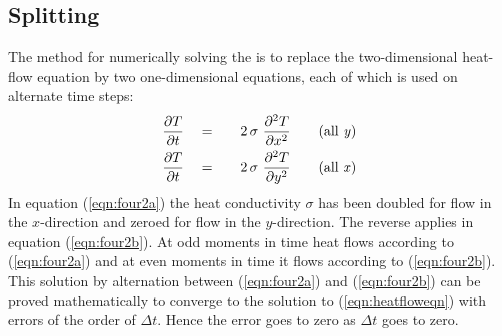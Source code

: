 \subsection{Splitting}
\par
The  method
for numerically solving
the 
is to replace the two-dimensional heat-flow equation
by two one-dimensional equations,
each of which is used on alternate time steps:
\begin{eqnarray}
{\partial T  \over \partial t}\ \  \ & = & \ \ \ 2\, \sigma\ {\partial^2 T 
\over \partial x^2}\ \ \ \ \ \ 
{\rm(all\ {\it  y })}
\label{eqn:four2a}
\\
{\partial T   \over \partial t} \ \  \ &=& \ \ \ 
2\, \sigma\  {\partial^2 T  \over \partial y^2}\ \ \ \ \ \ 
{\rm(all\ {\it  x })}
\label{eqn:four2b}
\end{eqnarray}
In equation (\ref{eqn:four2a}) the heat conductivity $\sigma$ has been
doubled for flow in the $x$-direction and zeroed for
flow in the $y$-direction.
The reverse applies in equation (\ref{eqn:four2b}).
At odd moments in time heat flows according to (\ref{eqn:four2a}) and
at even moments in time it flows according to (\ref{eqn:four2b}).
This solution by alternation between (\ref{eqn:four2a}) and (\ref{eqn:four2b})
can be proved mathematically to converge to the solution to 
(\ref{eqn:heatfloweqn}) with errors of the order of $ \Delta t $.
Hence the error goes to zero as  $ \Delta t $  goes to zero.  

